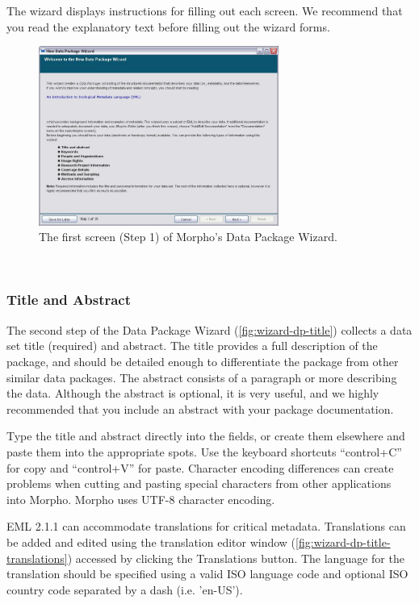 The wizard displays instructions for filling out each screen. We
recommend that you read the explanatory text before filling out the
wizard forms.

\begin{figure}
  \centering
    \includegraphics[width=0.7\textwidth]{images/wizard-dp-introduction.jpg}
  \caption{The first screen (Step 1) of Morpho's Data Package Wizard.}
  \label{fig:wizard-dp-introduction.jpg}
\end{figure}
 

\subsubsection{Title and Abstract} \label{sec:wizard-dp-title}

The second step of the Data Package Wizard
(\autoref{fig:wizard-dp-title}) collects a data set title (required) and
abstract. The title provides a full description of the package, and
should be detailed enough to differentiate the package from other
similar data packages. The abstract consists of a paragraph or more
describing the data. Although the abstract is optional, it is very
useful, and we highly recommended that you include an abstract with your
package documentation.

Type the title and abstract directly into the fields, or create them
elsewhere and paste them into the appropriate spots. Use the keyboard
shortcuts ``control+C'' for copy and ``control+V'' for paste. 
Character encoding differences can create problems when cutting and pasting 
special characters from other applications into Morpho. Morpho uses UTF-8 
character encoding.

EML 2.1.1 can accommodate translations for critical metadata. Translations can
be added and edited using the translation editor window 
(\autoref{fig:wizard-dp-title-translations}) accessed by clicking the Translations button. 
The language for the translation should be specified using a valid ISO language 
code and optional ISO country code separated by a dash (i.e. 'en-US').

